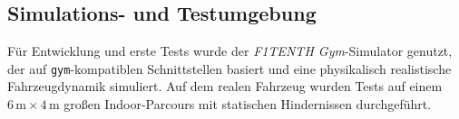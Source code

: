 \subsection{Simulations- und Testumgebung}
\label{subsec:simulation}

Für Entwicklung und erste Tests wurde der
\emph{F1TENTH Gym}-Simulator \cite{okelly2020f1tenth} genutzt,
der auf \texttt{gym}-kompatiblen Schnittstellen basiert und eine
physikalisch realistische Fahrzeugdynamik simuliert.
Auf dem realen Fahrzeug wurden Tests auf einem \(6\,\text{m} \times
4\,\text{m}\) großen Indoor-Parcours mit statischen Hindernissen
durchgeführt.
